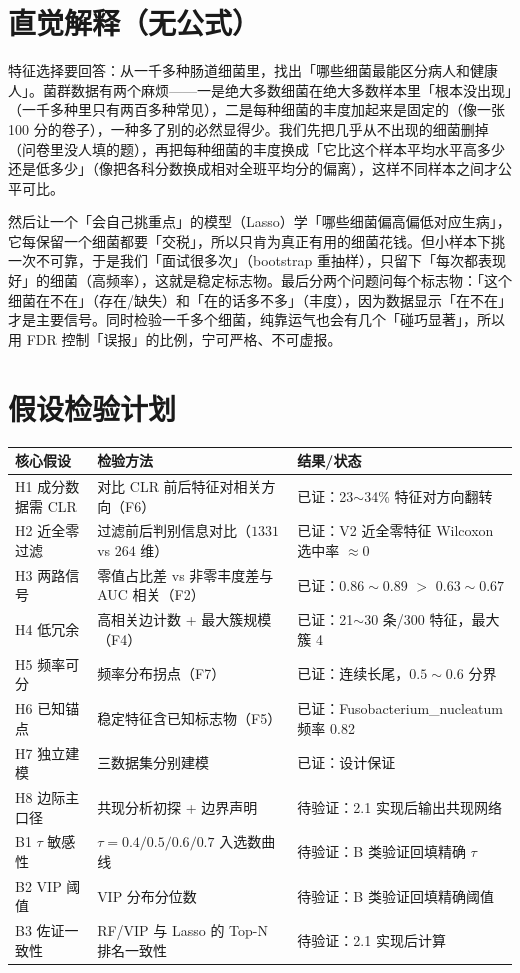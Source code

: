\documentclass{internal-report}
\begin{document}
\section{直觉解释（无公式）}

特征选择要回答：从一千多种肠道细菌里，找出「哪些细菌最能区分病人和健康人」。菌群数据有两个麻烦——一是绝大多数细菌在绝大多数样本里「根本没出现」（一千多种里只有两百多种常见），二是每种细菌的丰度加起来是固定的（像一张 100 分的卷子），一种多了别的必然显得少。我们先把几乎从不出现的细菌删掉（问卷里没人填的题），再把每种细菌的丰度换成「它比这个样本平均水平高多少还是低多少」（像把各科分数换成相对全班平均分的偏离），这样不同样本之间才公平可比。

然后让一个「会自己挑重点」的模型（Lasso）学「哪些细菌偏高偏低对应生病」，它每保留一个细菌都要「交税」，所以只肯为真正有用的细菌花钱。但小样本下挑一次不可靠，于是我们「面试很多次」（bootstrap 重抽样），只留下「每次都表现好」的细菌（高频率），这就是稳定标志物。最后分两个问题问每个标志物：「这个细菌在不在」（存在/缺失）和「在的话多不多」（丰度），因为数据显示「在不在」才是主要信号。同时检验一千多个细菌，纯靠运气也会有几个「碰巧显著」，所以用 FDR 控制「误报」的比例，宁可严格、不可虚报。

\section{假设检验计划}

\begin{center}
\footnotesize
\begin{tabular}{p{3.4cm}p{5.0cm}p{5.0cm}}
\toprule
核心假设 & 检验方法 & 结果/状态 \\
\midrule
H1 成分数据需 CLR & 对比 CLR 前后特征对相关方向（F6） & 已证：23$\sim$34\% 特征对方向翻转 \\
H2 近全零过滤 & 过滤前后判别信息对比（$1331$ vs $264$ 维） & 已证：V2 近全零特征 Wilcoxon 选中率 $\approx 0$ \\
H3 两路信号 & 零值占比差 vs 非零丰度差与 AUC 相关（F2） & 已证：$0.86\sim0.89$ $>$ $0.63\sim0.67$ \\
H4 低冗余 & 高相关边计数 + 最大簇规模（F4） & 已证：21$\sim$30 条/300 特征，最大簇 4 \\
H5 频率可分 & 频率分布拐点（F7） & 已证：连续长尾，$0.5\sim0.6$ 分界 \\
H6 已知锚点 & 稳定特征含已知标志物（F5） & 已证：Fusobacterium\_nucleatum 频率 0.82 \\
H7 独立建模 & 三数据集分别建模 & 已证：设计保证 \\
H8 边际主口径 & 共现分析初探 + 边界声明 & 待验证：2.1 实现后输出共现网络 \\
B1 $\tau$ 敏感性 & $\tau=0.4/0.5/0.6/0.7$ 入选数曲线 & 待验证：B 类验证回填精确 $\tau$ \\
B2 VIP 阈值 & VIP 分布分位数 & 待验证：B 类验证回填精确阈值 \\
B3 佐证一致性 & RF/VIP 与 Lasso 的 Top-N 排名一致性 & 待验证：2.1 实现后计算 \\
\bottomrule
\end{tabular}
\end{center}
\end{document}
